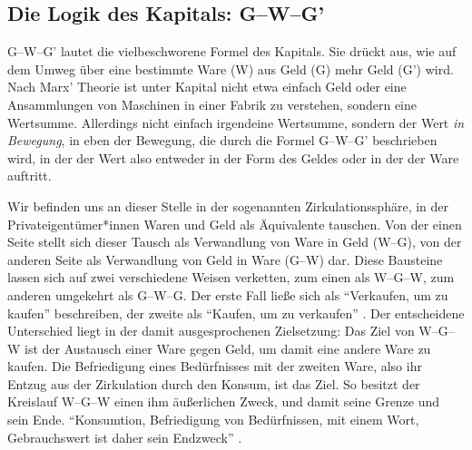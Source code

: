 \documentclass[12pt,
               DIV13,
               paper=a4,
               twoside=false,
               onehalfspacing,
               bibliography=totoc,
               toc=graduated,
               draft,
               ]{scrartcl}
\newcommand{\pc}[2]{\parencite[#1]{#2}}
\newcommand{\vgl}[2]{\parencite[vgl.][#1]{#2}}
\newcommand{\gwg}{G--W--G'\xspace}
\newcommand{\wgw}{W--G--W\xspace}
\begin{document}


\subsection{Die Logik des Kapitals: \gwg}
\label{gwg}

\gwg lautet die vielbeschworene Formel des Kapitals. Sie drückt aus,
wie auf dem Umweg über eine bestimmte Ware (W) aus Geld (G) mehr Geld
(G') wird. Nach Marx' Theorie ist unter Kapital nicht etwa einfach
Geld oder eine Ansammlungen von Maschinen in einer Fabrik zu
verstehen, sondern eine Wertsumme. Allerdings nicht einfach irgendeine
Wertsumme, sondern der Wert \emph{in Bewegung}, in eben der Bewegung,
die durch die Formel \gwg beschrieben wird, in der der Wert also
entweder in der Form des Geldes oder in der der Ware auftritt.



Wir befinden uns an dieser Stelle in der sogenannten
Zirkulationssphäre, in der Privateigentümer*innen Waren und Geld als
Äquivalente tauschen. Von der einen Seite stellt sich dieser Tausch
als Verwandlung von Ware in Geld (W--G), von der anderen Seite als
Verwandlung von Geld in Ware (G--W) dar. Diese Bausteine lassen sich
auf zwei verschiedene Weisen verketten, zum einen als \wgw, zum
anderen umgekehrt als G--W--G. Der erste Fall ließe sich als
"`Verkaufen, um zu kaufen"' beschreiben, der zweite als "`Kaufen, um
zu verkaufen"' \vgl{162}{kap}. Der entscheidene Unterschied liegt in
der damit ausgesprochenen Zielsetzung: Das Ziel von \wgw ist der
Austausch einer Ware gegen Geld, um damit eine andere Ware zu kaufen.
Die Befriedigung eines Bedürfnisses mit der zweiten Ware, also ihr
Entzug aus der Zirkulation durch den Konsum, ist das Ziel. So besitzt
der Kreislauf \wgw einen ihm äußerlichen Zweck, und damit seine Grenze
und sein Ende. "`Konsumtion, Befriedigung von Bedürfnissen, mit einem
Wort, Gebrauchswert ist daher sein Endzweck"' \pc{164}{kap}.

\end{document}
